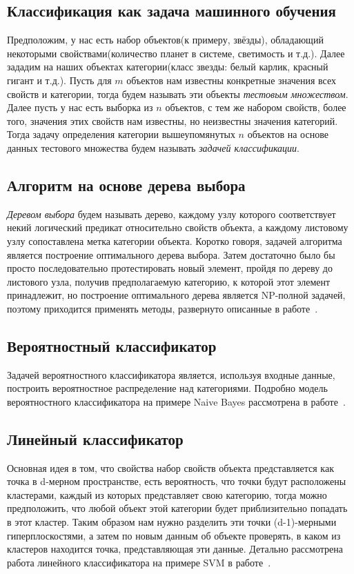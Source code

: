 \documentclass{article}
\begin{document}
\subsection{Классификация как задача машинного обучения}
Предположим, у нас есть набор объектов(к примеру, звёзды), обладающий некоторыми свойствами(количество планет в системе, светимость и т.д.). Далее зададим на наших объектах категории(класс звезды: белый карлик, красный гигант и т.д.). Пусть для $m$ объектов нам известны конкретные значения всех свойств и категории, тогда будем называть эти объекты \emph{тестовым множеством}. Далее пусть у нас есть выборка из $n$ объектов, с тем же набором свойств, более того, значения этих свойств нам известны, но неизвестны значения категорий. Тогда задачу определения категории вышеупомянутых $n$ объектов на основе данных тестового множества будем называть \emph{задачей классификации}.
\subsection{Алгоритм на основе дерева выбора}
\emph{Деревом выбора} будем называть дерево, каждому узлу которого соответствует некий логический предикат относительно свойств объекта, а каждому листовому узлу сопоставлена метка категории объекта. Коротко говоря, задачей алгоритма является построение оптимального дерева выбора. Затем достаточно было бы просто последовательно протестировать новый элемент, пройдя по дереву до листового узла, получив предполагаемую категорию, к которой этот элемент принадлежит, но построение оптимального дерева является NP-полной задачей, поэтому приходится применять методы, развернуто описанные в работе~\cite{desicionTree}.
\subsection{Вероятностный классификатор}
Задачей вероятностного классификатора является, используя входные данные, построить вероятностное распределение над категориями. Подробно модель вероятностного классификатора на примере Naive Bayes рассмотрена в работе~\cite{naiveBayes}.
\subsection{Линейный классификатор}
Основная идея в том, что свойства набор свойств объекта представляется как точка в d-мерном пространстве, есть вероятность, что точки будут расположены кластерами, каждый из которых представляет свою категорию, тогда можно предположить, что любой объект этой категории будет приблизительно попадать в этот кластер. Таким образом нам нужно разделить эти точки (d-1)-мерными гиперплоскостями, а затем по новым данным об объекте проверять, в каком из кластеров находится точка, представляющая эти данные. Детально рассмотрена работа линейного классификатора на примере SVM в работе~\cite{svm}.
\end{document}
